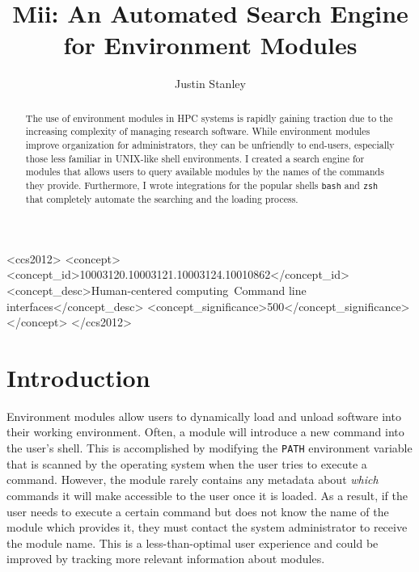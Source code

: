 \documentclass[manuscript,screen]{acmart}
\begin{document}
\title{Mii: An Automated Search Engine for Environment Modules}

\author{Justin Stanley}

\begin{abstract}
The use of environment modules in HPC systems is rapidly gaining traction due to the increasing complexity of
managing research software. While environment modules improve organization for administrators, they can be
unfriendly to end-users, especially those less familiar in UNIX-like shell environments. I created a search engine for
modules that allows users to query available modules by the names of the commands they provide. Furthermore,
I wrote integrations for the popular shells \texttt{bash} and \texttt{zsh} that completely automate the searching and the loading
process.
\end{abstract}

\begin{CCSXML}
<ccs2012>
<concept>
<concept_id>10003120.10003121.10003124.10010862</concept_id>
<concept_desc>Human-centered computing~Command line interfaces</concept_desc>
<concept_significance>500</concept_significance>
</concept>
</ccs2012>
\end{CCSXML}



\maketitle

\section{Introduction}
Environment modules allow users to dynamically load and unload software into their working environment.
Often, a module will introduce a new command into the user’s shell. This is accomplished by modifying
the \texttt{PATH} environment variable that is scanned by the operating system when the user tries to execute a
command. However, the module rarely contains any metadata about \textit{which} commands it will make accessible
to the user once it is loaded. As a result, if the user needs to execute a certain command but does not
know the name of the module which provides it, they must contact the system administrator to receive the
module name. This is a less-than-optimal user experience and could be improved by tracking more relevant
information about modules.
\end{document}
